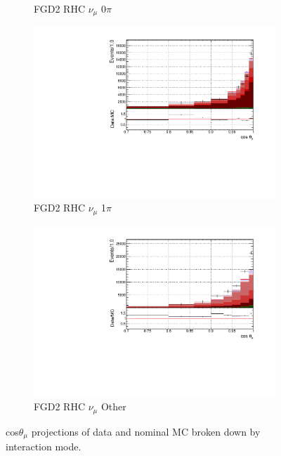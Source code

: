 \begin{figure}
\begin{subfigure}{.32\textwidth}
  \caption{FGD2 RHC $\nu_{\mu}$ 0$\pi$}
  \label{fig:tstack_FGD2_NuMuBkg_CC0pi_in_AntiNu_Mode}
\end{subfigure}
\begin{subfigure}{.32\textwidth}
  \centering
  \includegraphics[width=0.95\linewidth]{figs/FGD2_NuMuBkg_CC1pi_in_AntiNu_Mode_t}
  \caption{FGD2 RHC $\nu_{\mu}$ 1$\pi$}
  \label{fig:tstack_FGD2_NuMuBkg_CC1pi_in_AntiNu_Mode}
\end{subfigure}
\begin{subfigure}{.32\textwidth}
  \centering
  \includegraphics[width=0.95\linewidth]{figs/FGD2_NuMuBkg_CCOther_in_AntiNu_Mode_t}
  \caption{FGD2 RHC $\nu_{\mu}$ Other}
  \label{fig:tstack_FGD2_NuMuBkg_CCOther_in_AntiNu_Mode}
\end{subfigure}
\caption{cos$\theta_{\mu}$ projections of data and nominal MC broken down by interaction mode.}
\label{fig:tstack}
\end{figure}


